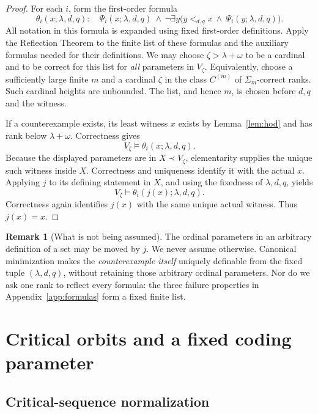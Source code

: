 \documentclass[11pt,letterpaper]{article}
\theoremstyle{definition}
\newtheorem{remark}[definition]{Remark}
\begin{document}
\begin{proof}
For each $i$, form the first-order formula
\[
 \theta_i(x;\lambda,d,q):\quad
 \Psi_i(x;\lambda,d,q)\ \wedge\
 \neg\exists y\bigl(y<_{d,q}x\ \wedge\ \Psi_i(y;\lambda,d,q)\bigr).
\]
All notation in this formula is expanded using fixed first-order definitions. Apply the Reflection Theorem to the finite list of these formulas and the auxiliary formulas needed for their definitions. We may choose $\zeta>\lambda+\omega$ to be a cardinal and to be correct for this list for \emph{all} parameters in $V_\zeta$. Equivalently, choose a sufficiently large finite $m$ and a cardinal $\zeta$ in the class $C^{(m)}$ of $\Sigma_m$-correct ranks. Such cardinal heights are unbounded. The list, and hence $m$, is chosen before $d,q$ and the witness.

If a counterexample exists, its least witness $x$ exists by Lemma~\ref{lem:hod} and has rank below $\lambda+\omega$. Correctness gives
\[
                        V_\zeta\models\theta_i(x;\lambda,d,q).
\]
Because the displayed parameters are in $X\prec V_\zeta$, elementarity supplies the unique such witness inside $X$. Correctness and uniqueness identify it with the actual $x$. Applying $j$ to its defining statement in $X$, and using the fixedness of $\lambda,d,q$, yields
\[
                        V_\zeta\models\theta_i(j(x);\lambda,d,q).
\]
Correctness again identifies $j(x)$ with the same unique actual witness. Thus $j(x)=x$.
\end{proof}

\begin{remark}[What is not being assumed]\label{rem:ordinals}
The ordinal parameters in an arbitrary definition of a set may be moved by $j$. We never assume otherwise. Canonical minimization makes the \emph{counterexample itself} uniquely definable from the fixed tuple $(\lambda,d,q)$, without retaining those arbitrary ordinal parameters. Nor do we ask one rank to reflect every formula: the three failure properties in Appendix~\ref{app:formulas} form a fixed finite list.
\end{remark}

\section{Critical orbits and a fixed coding parameter}\label{sec:orbits}

\subsection{Critical-sequence normalization}
\end{document}
